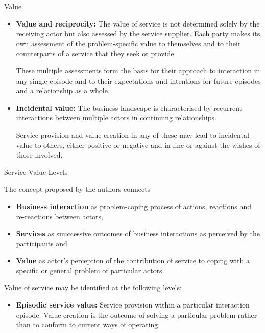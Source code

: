 \documentclass{beamer}
\begin{document}
\begin{frame}{Value}\small
\begin{itemize}

\item \textbf{Value and reciprocity:} The value of service is not determined
  solely by the receiving actor but also assessed by the service supplier.
  Each party makes its own assessment of the problem-speciﬁc value to
  themselves and to their counterparts of a service that they seek or provide.

  These multiple assessments form the basis for their approach to interaction
  in any single episode and to their expectations and intentions for future
  episodes and a relationship as a whole.

\item \textbf{Incidental value:} The business landscape is characterised by
  recurrent interactions between multiple actors in continuing relationships.

  Service provision and value creation in any of these may lead to incidental
  value to others, either positive or negative and in line or against the
  wishes of those involved.
\end{itemize}
\end{frame}

\begin{frame}{Service Value Levels}\small

The concept proposed by the authors connects
\begin{itemize}
\item \textbf{Business interaction} as problem-coping process of actions,
  reactions and re-reactions between actors,
\item \textbf{Services} as suuccessive outcomes of business interactions as
  perceived by the participants and
\item \textbf{Value} as actor's perception of the contribution of service to
  coping with a specific or general problem of particular actors.
\end{itemize}
  
Value of service may be identified at the following levels:
\begin{itemize}
\item \textbf{Episodic service value:} Service provision within a particular
  interaction episode. Value creation is the outcome of solving a particular
  problem rather than to conform to current ways of operating.
\end{itemize}
\end{frame}
\end{document}
